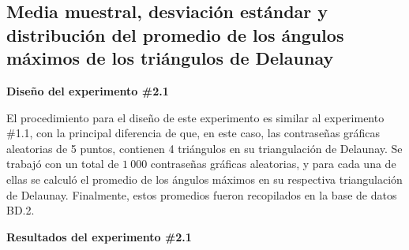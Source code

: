 \documentclass[12pt]{report}
\begin{document}
\subsection{Media muestral, desviación estándar y distribución del promedio de los ángulos máximos de los triángulos de Delaunay }
\label{sec:2.1}

\textbf{Diseño del experimento \#2.1}

El procedimiento para el diseño de este experimento es similar al experimento \#1.1, con la principal diferencia de que, en este caso, las contraseñas gráficas aleatorias de 5 puntos, contienen 4 triángulos en su triangulación de Delaunay. Se trabajó con un total de $1\ 000$ contraseñas gráficas aleatorias, y para cada una de ellas se calculó el promedio de los ángulos máximos en su respectiva triangulación de Delaunay. Finalmente, estos promedios fueron recopilados en la base de datos BD.2.



\textbf{Resultados del experimento \#2.1}
\end{document}
